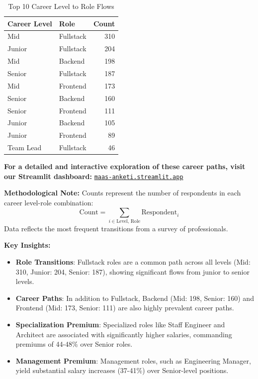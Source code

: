 \documentclass[12pt,a4paper]{article}
\begin{document}
\begin{table}[H]
    \centering
    \small
    \begin{tabular}{llr}
        \toprule
        \textbf{Career Level} & \textbf{Role} & \textbf{Count} \\
        \midrule
        Mid                   & Fullstack     & 310            \\
        Junior                & Fullstack     & 204            \\
        Mid                   & Backend       & 198            \\
        Senior                & Fullstack     & 187            \\
        Mid                   & Frontend      & 173            \\
        Senior                & Backend       & 160            \\
        Senior                & Frontend      & 111            \\
        Junior                & Backend       & 105            \\
        Junior                & Frontend      & 89             \\
        Team Lead             & Fullstack     & 46             \\
        \bottomrule
    \end{tabular}
    \caption{Top 10 Career Level to Role Flows}
\end{table}

\textbf{For a detailed and interactive exploration of these career paths, visit our Streamlit dashboard:} \href{https://maas-anketi.streamlit.app/#career-level-role-flow-sankey}{\texttt{maas-anketi.streamlit.app}}

\textbf{Methodological Note:} Counts represent the number of respondents in each career level-role combination:
\[
    \text{Count} = \sum_{i \in \text{Level, Role}} \text{Respondent}_i
\]
Data reflects the most frequent transitions from a survey of professionals.

\textbf{Key Insights:}
\begin{itemize}
    \item \textbf{Role Transitions}: Fullstack roles are a common path across all levels (Mid: 310, Junior: 204, Senior: 187), showing significant flows from junior to senior levels.
    \item \textbf{Career Paths}: In addition to Fullstack, Backend (Mid: 198, Senior: 160) and Frontend (Mid: 173, Senior: 111) are also highly prevalent career paths.
    \item \textbf{Specialization Premium}: Specialized roles like Staff Engineer and Architect are associated with significantly higher salaries, commanding premiums of 44-48\% over Senior roles.
    \item \textbf{Management Premium}: Management roles, such as Engineering Manager, yield substantial salary increases (37-41\%) over Senior-level positions.
\end{itemize}
\end{document}
